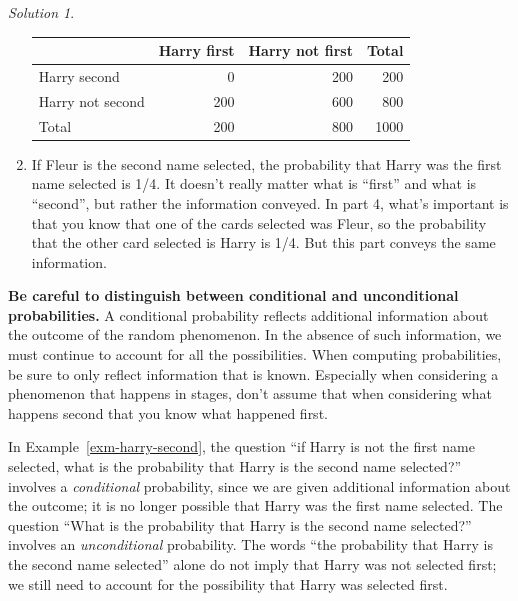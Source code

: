 \documentclass[
  letterpaper,
  DIV=11,
  numbers=noendperiod]{scrreprt}
\theoremstyle{plain}
\theoremstyle{definition}
\theoremstyle{definition}
\theoremstyle{definition}
\theoremstyle{remark}
\newtheorem{refsolution}{Solution}[chapter]
\begin{document}
\begin{tcolorbox}
\begin{refsolution}
\begin{enumerate}
  \begin{longtable}[]{@{}lrrr@{}}
  \toprule\noalign{}
  & Harry first & Harry not first & Total \\
  \midrule\noalign{}
  \endhead
  \bottomrule\noalign{}
  \endlastfoot
  Harry second & 0 & 200 & 200 \\
  Harry not second & 200 & 600 & 800 \\
  Total & 200 & 800 & 1000 \\
  \end{longtable}
\item
  If Fleur is the second name selected, the probability that Harry was
  the first name selected is 1/4. It doesn't really matter what is
  ``first'' and what is ``second'', but rather the information conveyed.
  In part 4, what's important is that you know that one of the cards
  selected was Fleur, so the probability that the other card selected is
  Harry is 1/4. But this part conveys the same information.
\end{enumerate}

\label{sol-harry-second}

\end{refsolution}

\end{tcolorbox}

\textbf{Be careful to distinguish between conditional and unconditional
probabilities.} A conditional probability reflects additional
information about the outcome of the random phenomenon. In the absence
of such information, we must continue to account for all the
possibilities. When computing probabilities, be sure to only reflect
information that is known. Especially when considering a phenomenon that
happens in stages, don't assume that when considering what happens
second that you know what happened first.

In Example~\ref{exm-harry-second}, the question ``if Harry is not the
first name selected, what is the probability that Harry is the second
name selected?'' involves a \emph{conditional} probability, since we are
given additional information about the outcome; it is no longer possible
that Harry was the first name selected. The question ``What is the
probability that Harry is the second name selected?'' involves an
\emph{unconditional} probability. The words ``the probability that Harry
is the second name selected'' alone do not imply that Harry was not
selected first; we still need to account for the possibility that Harry
was selected first.
\end{document}
